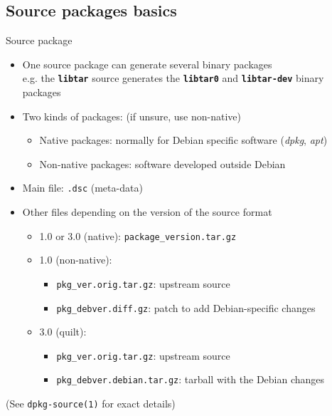\documentclass[10pt,final]{beamer}
\begin{document}
\subsection{Source packages basics}
\begin{frame}{Source package}
  \begin{itemize}
  \item One source package can generate several binary packages\\
    {\small e.g. the \texttt{\bfseries libtar} source generates the
      \texttt{\bfseries libtar0} and \texttt{\bfseries libtar-dev} binary
      packages} \hbr
  \item Two kinds of packages: (if unsure, use non-native)
    \begin{itemize}
      \small
    \item Native packages: normally for Debian specific software (\textsl{dpkg}, \textsl{apt})
    \item Non-native packages: software developed outside Debian
    \end{itemize}
    \hbr
  \item Main file: \texttt{.dsc} (meta-data)
    \hbr
  \item Other files depending on the version of the source format
    \begin{itemize}
    \item 1.0 or 3.0 (native): \texttt{package\_version.tar.gz}
      \hbr
    \item 1.0 (non-native):
      \begin{itemize}
      \item \texttt{pkg\_ver.orig.tar.gz}: upstream source
      \item \texttt{pkg\_debver.diff.gz}: patch to add Debian-specific changes
      \end{itemize}
      \hbr
    \item 3.0 (quilt):
      \begin{itemize}
      \item \texttt{pkg\_ver.orig.tar.gz}: upstream source
      \item \texttt{pkg\_debver.debian.tar.gz}: tarball with the Debian changes
      \end{itemize}
    \end{itemize}
  \end{itemize}
  \hbr
  (See \texttt{dpkg-source(1)} for exact details)
\end{frame}
\end{document}
